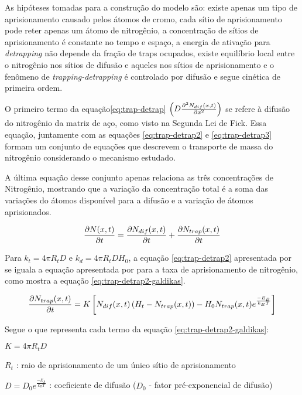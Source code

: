 As hipóteses tomadas para a construção do modelo são: existe apenas um tipo de aprisionamento causado pelos átomos de cromo, cada sítio de aprisionamento pode reter apenas um átomo de nitrogênio, a concentração de sítios de aprisionamento é constante no tempo e espaço, a energia de ativação para  \textit{detrapping} não depende da fração de traps ocupados, existe equilíbrio local entre o nitrogênio nos sítios de difusão e aqueles nos sítios de aprisionamento e o fenômeno de \textit{trapping-detrapping} é controlado por difusão e segue cinética de primeira ordem.

O primeiro termo da equação\autoref{eq:trap-detrap} $\left(D\pdv[2]{N_{dif}(x,t)}{x}\right)$ se refere à difusão do nitrogênio da matriz de aço, como visto na Segunda Lei de Fick. Essa equação, juntamente com as equações \autoref{eq:trap-detrap2} e \autoref{eq:trap-detrap3} formam um conjunto de equações que descrevem o transporte de massa do nitrogênio considerando o mecanismo estudado.

A última equação desse conjunto apenas relaciona as três concentrações de Nitrogênio, mostrando que a variação da concentração total é a soma das variações do átomos disponível para a difusão e a variação de átomos aprisionados. 

\begin{equation}
\label{eq:trap-detrap3}
\pdv{N(x,t)}{t} = \pdv{N_{dif}(x,t)}{t} + \pdv{N_{trap}(x,t)}{t}
\end{equation}

Para $k_t = 4{\pi}R_tD$ e $k_d = 4{\pi}R_tDH_0$, a equação \autoref{eq:trap-detrap2} apresentada por \cite{parascandola2000nitrogen} se iguala a equação apresentada por \cite{moskalioviene2011modeling} para a taxa de aprisionamento de nitrogênio, como mostra a equação \autoref{eq:trap-detrap2-galdikas}.

\begin{equation}
\label{eq:trap-detrap2-galdikas}
\pdv{N_{trap}(x,t)}{t} = K\left[N_{dif}(x,t)\left(H_t-N_{trap}(x,t)\right) - H_0 N_{trap}(x,t)e^{\frac{-E_B}{k_BT}}\right] 
\end{equation}

Segue o que representa cada termo da equação \autoref{eq:trap-detrap2-galdikas}:

$K=4{\pi}R_tD$

$R_t$ : raio de aprisionamento de um único sítio de aprisionamento

$D=D_0e^{\frac{-E_A}{k_BT}}$ : coeficiente de difusão ($D_0$ - fator pré-exponencial de difusão)


